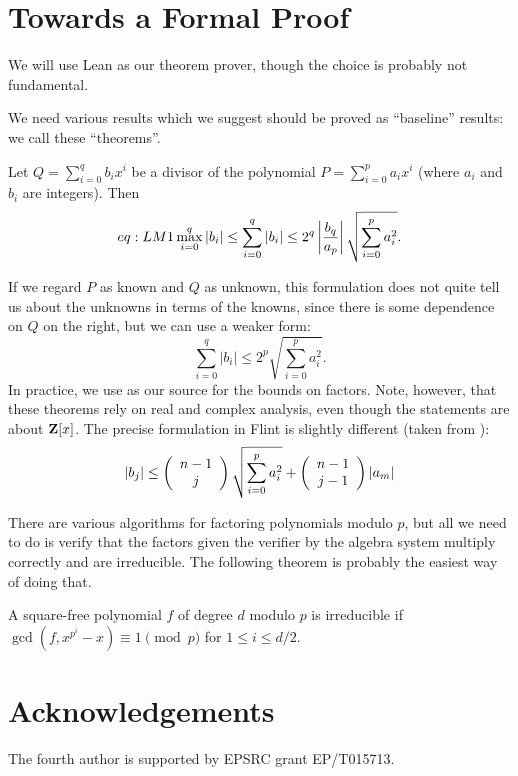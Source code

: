 \documentclass{llncs}
\begin{document}
\section{Towards a Formal Proof}
We will use Lean as our theorem prover, though the choice is probably not fundamental.
\par
We need various results which we suggest should be proved as ``baseline'' results: we call these ``theorems''.
\begin{theorem}\label{thm:LM}
Let $Q = \sum_{i=0}^q{b_i x^i}$ be a divisor of the polynomial
$P=\sum_{i=0}^p{a_ix^i}$ (where $a_i$ and $b_i$ are integers). Then
\begin{equation}{eq:LM1}
\max_{i=0}^q\left\vert b_i \right\vert \le
\sum_{i=0}^q \left\vert b_i \right\vert \le
2^q \left\vert b_q \over a_p \right\vert \sqrt{\sum_{i=0}^p{a_i^2}} .
\end{equation}
\end{theorem}
\par
If we regard $P$ as known and $Q$ as unknown, this formulation does not quite
tell us about the unknowns in terms of the knowns, since there is some
dependence on $Q$ on the right, but we can use a weaker form:
\begin{equation}
\sum_{i=0}^q \left\vert b_i \right\vert \le
2^p \sqrt{\sum_{i=0}^p{a_i^2}} .
\end{equation}
In practice, we use \cite{Abbott2013b} as our source for the bounds on factors. Note, however, that these theorems rely on real and complex analysis, even though the statements are about ${\bf Z}[x]$. The precise formulation in Flint is slightly different (taken from \cite[Theorem 3.5.1]{Cohen1993a}):
\begin{equation}\def\abs#1{|#1|}\def\binom#1#2{\left(\begin{array}{c}#1\\#2\end{array}\right)}
    \abs{b_j} \leq \binom{n-1}{j} \sqrt{\sum_{i=0}^p{a_i^2}}+ \binom{n-1}{j-1} \abs{a_m}
    \end{equation}
\par
There are various algorithms for factoring polynomials modulo $p$, but all we need to do is verify that the factors given the verifier by the algebra system multiply correctly and are irreducible. The following theorem is probably the easiest way of doing that.
\begin{theorem}
A square-free polynomial $f$ of degree $d$ modulo $p$ is irreducible if $\gcd(f,x^{p^i}-x)\equiv 1 \pmod p$  for $1\le i\le d/2$.
\end{theorem}
\section*{Acknowledgements}The fourth author is supported by EPSRC grant EP/T015713.

\end{document}
